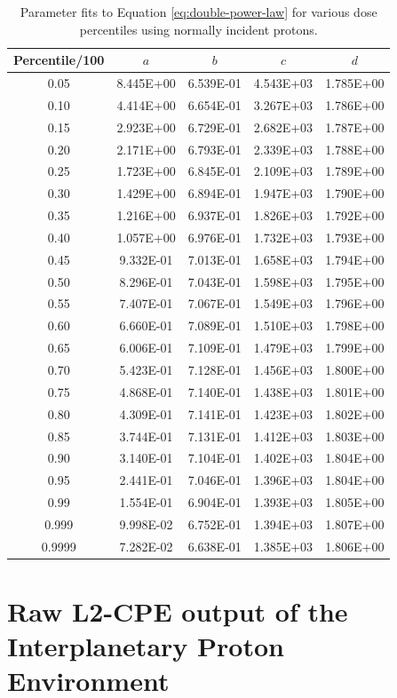 \documentclass{hitec}
\begin{document}
\begin{table}[!h]\centering
	\caption{Parameter fits to Equation \eqref{eq:double-power-law} for various dose percentiles using normally incident protons.}\label{tab:double-power-law-parameters}
	\begin{tabular}{|c | c | c | c | c |}\hline
		Percentile/100 & $a$ & $b$ & $c$ & $d$ \\\hline

0.05&8.445E+00&6.539E-01&4.543E+03&1.785E+00\\\hline
0.10&4.414E+00&6.654E-01&3.267E+03&1.786E+00\\\hline
0.15&2.923E+00&6.729E-01&2.682E+03&1.787E+00\\\hline
0.20&2.171E+00&6.793E-01&2.339E+03&1.788E+00\\\hline
0.25&1.723E+00&6.845E-01&2.109E+03&1.789E+00\\\hline
0.30&1.429E+00&6.894E-01&1.947E+03&1.790E+00\\\hline
0.35&1.216E+00&6.937E-01&1.826E+03&1.792E+00\\\hline
0.40&1.057E+00&6.976E-01&1.732E+03&1.793E+00\\\hline
0.45&9.332E-01&7.013E-01&1.658E+03&1.794E+00\\\hline
0.50&8.296E-01&7.043E-01&1.598E+03&1.795E+00\\\hline
0.55&7.407E-01&7.067E-01&1.549E+03&1.796E+00\\\hline
0.60&6.660E-01&7.089E-01&1.510E+03&1.798E+00\\\hline
0.65&6.006E-01&7.109E-01&1.479E+03&1.799E+00\\\hline
0.70&5.423E-01&7.128E-01&1.456E+03&1.800E+00\\\hline
0.75&4.868E-01&7.140E-01&1.438E+03&1.801E+00\\\hline
0.80&4.309E-01&7.141E-01&1.423E+03&1.802E+00\\\hline
0.85&3.744E-01&7.131E-01&1.412E+03&1.803E+00\\\hline
0.90&3.140E-01&7.104E-01&1.402E+03&1.804E+00\\\hline
0.95&2.441E-01&7.046E-01&1.396E+03&1.804E+00\\\hline
0.99&1.554E-01&6.904E-01&1.393E+03&1.805E+00\\\hline
0.999&9.998E-02&6.752E-01&1.394E+03&1.807E+00\\\hline
0.9999&7.282E-02&6.638E-01&1.385E+03&1.806E+00\\\hline

	\end{tabular}
\end{table}

\newpage
\section{Raw L2-CPE output of the Interplanetary Proton Environment}
\label{App:Raw L2-CPE output of the Interplanetary Proton Environment}


\end{document}
